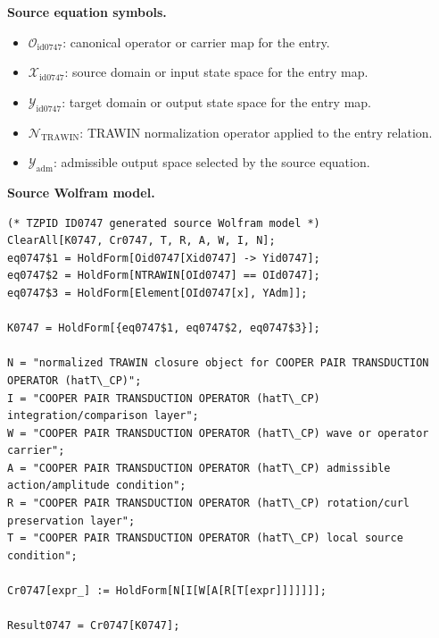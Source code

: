 \begin{minipage}[t]{0.49\linewidth}
\begingroup
\small
\raggedright
\textbf{Source equation symbols.}\par
\begin{itemize}[leftmargin=1.35em,itemsep=1pt,topsep=1pt,parsep=0pt]
    \item $\mathcal{O}_{\mathrm{id0747}}$: canonical operator or carrier map for the entry.
    \item $\mathcal{X}_{\mathrm{id0747}}$: source domain or input state space for the entry map.
    \item $\mathcal{Y}_{\mathrm{id0747}}$: target domain or output state space for the entry map.
    \item $\mathcal{N}_{\mathrm{TRAWIN}}$: TRAWIN normalization operator applied to the entry relation.
    \item $\mathcal{Y}_{\mathrm{adm}}$: admissible output space selected by the source equation.
\end{itemize}
\endgroup
\end{minipage}\hfill
\begin{minipage}[t]{0.47\linewidth}
\begingroup
\scriptsize
\raggedright
\textbf{Source Wolfram model.}\par
\begin{Verbatim}[fontsize=\tiny,breaklines=true,breakanywhere=true]
(* TZPID ID0747 generated source Wolfram model *)
ClearAll[K0747, Cr0747, T, R, A, W, I, N];
eq0747$1 = HoldForm[Oid0747[Xid0747] -> Yid0747];
eq0747$2 = HoldForm[NTRAWIN[OId0747] == OId0747];
eq0747$3 = HoldForm[Element[OId0747[x], YAdm]];

K0747 = HoldForm[{eq0747$1, eq0747$2, eq0747$3}];

N = "normalized TRAWIN closure object for COOPER PAIR TRANSDUCTION OPERATOR (hatT\_CP)";
I = "COOPER PAIR TRANSDUCTION OPERATOR (hatT\_CP) integration/comparison layer";
W = "COOPER PAIR TRANSDUCTION OPERATOR (hatT\_CP) wave or operator carrier";
A = "COOPER PAIR TRANSDUCTION OPERATOR (hatT\_CP) admissible action/amplitude condition";
R = "COOPER PAIR TRANSDUCTION OPERATOR (hatT\_CP) rotation/curl preservation layer";
T = "COOPER PAIR TRANSDUCTION OPERATOR (hatT\_CP) local source condition";

Cr0747[expr_] := HoldForm[N[I[W[A[R[T[expr]]]]]]];

Result0747 = Cr0747[K0747];
\end{Verbatim}
\endgroup
\end{minipage}

